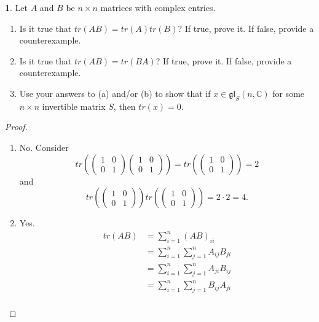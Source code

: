 \documentclass[12pt]{article}
\newcommand{\gl}{\mathfrak{gl}}
\theoremstyle{definition}
\newtheorem{ex}{}
\begin{document}
\begin{ex}
	Let $A$ and $B$ be $n \times n$ matrices with complex entries.
	\begin{enumerate}[label=(\alph*)]
		\item Is it true that $tr(AB) = tr(A)tr(B)$?
		      If true, prove it.
		      If false, provide a counterexample.
		\item Is it true that $tr(AB) = tr(BA)$?
		      If true, prove it.
		      If false, provide a counterexample.
		\item Use your answers to (a) and/or (b) to show that if $x \in \gl_S(n, \mathbb{C})$ for some $n \times n$ invertible matrix $S$, then $tr(x) = 0$.
	\end{enumerate}
\end{ex}
\begin{proof}\
	\begin{enumerate}[label=(\alph*)]
		\item No.
		      Consider \begin{equation*}
			      tr \left( \begin{pmatrix}1 & 0 \\ 0 & 1\end{pmatrix}\begin{pmatrix}1 & 0 \\ 0 & 1\end{pmatrix} \right) = tr \left( \begin{pmatrix}1 & 0 \\ 0 & 1\end{pmatrix} \right) = 2
		      \end{equation*}
		      and \begin{equation*}
			      tr \left( \begin{pmatrix}1 & 0 \\ 0 & 1\end{pmatrix}\right) tr\left(\begin{pmatrix}1 & 0 \\ 0 & 1\end{pmatrix} \right) = 2 \cdot 2 = 4.
		      \end{equation*}
		\item Yes. \begin{align*}
			      tr(AB) & = \sum_{i=1}^n (AB)_{ii}                 \\
			             & = \sum_{i=1}^n \sum_{j=1}^n A_{ij}B_{ji} \\
			             & = \sum_{i=1}^n \sum_{j=1}^n A_{ji}B_{ij} \\
			             & = \sum_{i=1}^n \sum_{j=1}^n B_{ij}A_{ji} \\

\end{align*}
\end{enumerate}
\end{proof}
\end{document}
